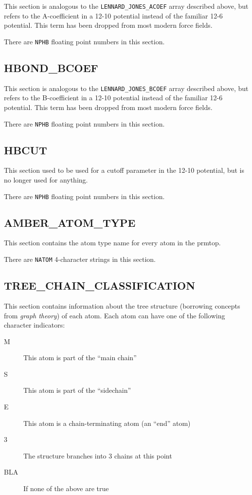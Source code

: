 This section is analogous to the {\tt LENNARD\_JONES\_ACOEF} array described
above, but refers to the A-coefficient in a 12-10 potential instead of the
familiar 12-6 potential. This term has been dropped from most modern force
fields.


\noindent There are {\tt NPHB} floating point numbers in this section.

\subsection*{HBOND\_BCOEF}

This section is analogous to the {\tt LENNARD\_JONES\_BCOEF} array described
above, but refers to the B-coefficient in a 12-10 potential instead of the
familiar 12-6 potential. This term has been dropped from most modern force
fields.


\noindent There are {\tt NPHB} floating point numbers in this section.

\subsection*{HBCUT}

This section used to be used for a cutoff parameter in the 12-10 potential, but
is no longer used for anything.


\noindent There are {\tt NPHB} floating point numbers in this section.

\subsection*{AMBER\_ATOM\_TYPE}

This section contains the atom type name for every atom in the prmtop.


\noindent There are {\tt NATOM} 4-character strings in this section.

\subsection*{TREE\_CHAIN\_CLASSIFICATION}

This section contains information about the tree structure (borrowing concepts
from \emph{graph theory}) of each atom. Each atom can have one of the following
character indicators:
\begin{description}
   \item[M] This atom is part of the ``main chain''
   \item[S] This atom is part of the ``sidechain''
   \item[E] This atom is a chain-terminating atom (\ie an ``end'' atom)
   \item[3] The structure branches into 3 chains at this point
   \item[BLA] If none of the above are true
\end{description}


